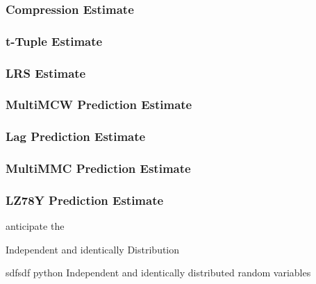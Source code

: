 \subsubsection{Compression Estimate}\label{non-iid-est:compe}
\subsubsection{t-Tuple Estimate}\label{non-iid-est:tte}
\subsubsection{LRS Estimate}\label{non-iid-est:lrs}
\subsubsection{MultiMCW Prediction Estimate}\label{non-iid-est:mmcwpe}
\subsubsection{Lag Prediction Estimate}\label{non-iid-est:lpe}
\subsubsection{MultiMMC Prediction Estimate}\label{non-iid-est:mmcpe}
\subsubsection{LZ78Y Prediction Estimate}\label{non-iid-est:lz78y}


anticipate the


Independent and identically Distribution

 sdfsdf
 \gls{python}
Independent and identically distributed random variables


%
%
%












